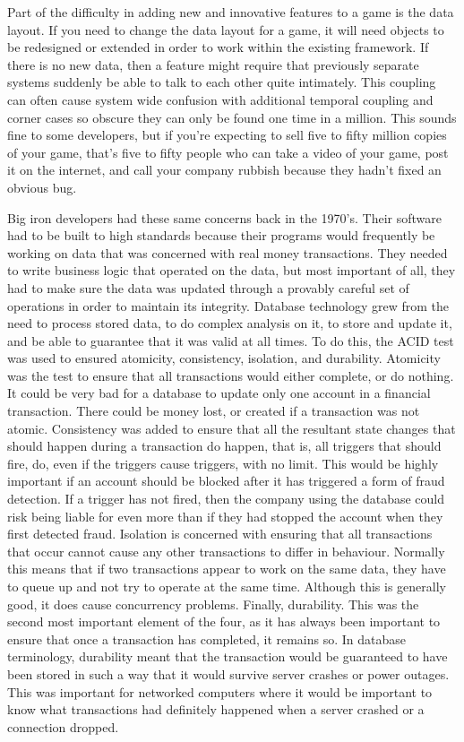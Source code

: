 Part of the difficulty in adding new and innovative features to a game is the
data layout. If you need to change the data layout for a game, it will need
objects to be redesigned or extended in order to work within the existing
framework. If there is no new data, then a feature might require that
previously separate systems suddenly be able to talk to each other quite
intimately. This coupling can often cause system wide confusion with additional
temporal coupling and corner cases so obscure they can only be found one time
in a million. This sounds fine to some developers, but if you're expecting to
sell five to fifty million copies of your game, that's five to fifty people who
can take a video of your game, post it on the internet, and call your company
rubbish because they hadn't fixed an obvious bug.

Big iron developers had these same concerns back in the 1970's. Their software
had to be built to high standards because their programs would frequently be
working on data that was concerned with real money transactions. They needed to
write business logic that operated on the data, but most important of all, they
had to make sure the data was updated through a provably careful set of
operations in order to maintain its integrity. Database technology grew from
the need to process stored data, to do complex analysis on it, to store and
update it, and be able to guarantee that it was valid at all times. To do this,
the ACID test was used to ensured atomicity, consistency, isolation, and
durability.  Atomicity was the test to ensure that all transactions would
either complete, or do nothing. It could be very bad for a database to update
only one account in a financial transaction. There could be money lost, or
created if a transaction was not atomic. Consistency was added to ensure that
all the resultant state changes that should happen during a transaction do
happen, that is, all triggers that should fire, do, even if the triggers cause
triggers, with no limit. This would be highly important if an account should be
blocked after it has triggered a form of fraud detection. If a trigger has not
fired, then the company using the database could risk being liable for even
more than if they had stopped the account when they first detected fraud.
Isolation is concerned with ensuring that all transactions that occur cannot
cause any other transactions to differ in behaviour. Normally this means that
if two transactions appear to work on the same data, they have to queue up and
not try to operate at the same time. Although this is generally good, it does
cause concurrency problems. Finally, durability. This was the second most
important element of the four, as it has always been important to ensure that
once a transaction has completed, it remains so. In database terminology,
durability meant that the transaction would be guaranteed to have been stored
in such a way that it would survive server crashes or power outages. This was
important for networked computers where it would be important to know what
transactions had definitely happened when a server crashed or a connection
dropped.

